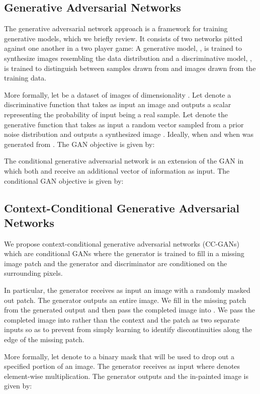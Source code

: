 \documentclass{article} \usepackage{iclr2017_conference,times}
\begin{document}
\subsection{Generative Adversarial Networks}
The generative adversarial network approach \citep{goodfellow2014} is a
framework for training generative models, which we briefly review.  
It consists of two networks pitted against one another in a two player game:
A generative model, , is trained to synthesize images resembling the data distribution and a discriminative model, , is trained to distinguish between samples drawn from  and images drawn from the training data.

More formally, let  be a dataset of images of dimensionality .
Let  denote a discriminative function that takes as input an image  and outputs a scalar representing the probability  of input  being a real sample.
Let  denote the generative function that takes as input a random vector  sampled from a prior noise distribution  and outputs a synthesized image . Ideally,  when  and  when  was generated from .
The GAN objective is given by:


The conditional generative adversarial network \citep{mirza14} is an extension of the GAN in which both  and  receive an additional vector of information  as input. The conditional GAN objective is given by:



\subsection{Context-Conditional Generative Adversarial Networks}
We propose context-conditional generative adversarial networks (CC-GANs) which are
conditional GANs where the generator is trained to
fill in a missing image patch and the generator and discriminator are
conditioned on the surrounding pixels. 

In particular, the generator  receives as input an image with a
randomly masked out patch.  The generator outputs an entire image. 
We fill in the missing patch from the generated output and then pass the completed image
into .  
We pass the completed image into  rather than the context and the patch as two separate inputs so as to prevent  from simply learning to identify discontinuities along the edge of the missing patch.

More formally, let  denote to a binary mask that will be used to drop out a specified portion of an image. 
The generator receives as input  where  denotes element-wise multiplication.
The generator outputs  and the in-painted image  is given by: 
\end{document}

